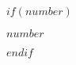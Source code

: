 $if(number)$
\thispagestyle{plain}
\begin{center}
  \vspace*{\fill}
  {\Huge\bfseries $number$}
  \vspace*{\fill}
\end{center}
\clearpage
$endif$
